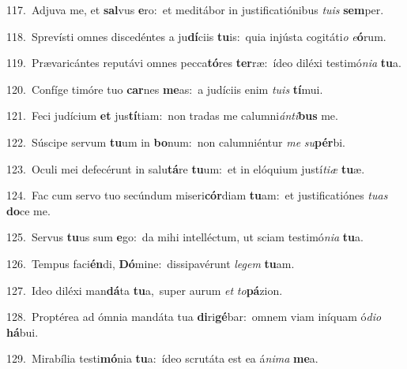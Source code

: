 {\numbfont\textcolor{\numbcolor}{117.}}~Adjuva me, et \textbf{sal}\-vus \textbf{e}\-ro:~\star et meditábor in justificatiónibus \textit{tu}\-\textit{is} \textbf{sem}\-per.\par
{\numbfont\textcolor{\numbcolor}{118.}}~Sprevísti omnes discedéntes a ju\-\textbf{dí}\-ciis \textbf{tu}\-is:~\star quia injústa cogitáti\textit{o} \textit{e}\-\textbf{ó}rum.\par
{\numbfont\textcolor{\numbcolor}{119.}}~Prævaricántes reputávi omnes pecca\-\textbf{tó}\-res \textbf{ter}\-ræ:~\star ídeo diléxi testimó\-\textit{ni}\-\textit{a} \textbf{tu}\-a.\par
{\numbfont\textcolor{\numbcolor}{120.}}~Confíge timóre tuo \textbf{car}\-nes \textbf{me}\-as:~\star a judíciis enim \textit{tu}\-\textit{is} \textbf{tí}\-mui.\par
{\numbfont\textcolor{\numbcolor}{121.}}~Feci judícium \textbf{et} jus\-\textbf{tí}\-tiam:~\star non tradas me calumni\-\textit{án}\-\textit{ti}\textbf{bus} me.\par
{\numbfont\textcolor{\numbcolor}{122.}}~Súscipe servum \textbf{tu}\-um in \textbf{bo}\-num:~\star non calumniéntur \textit{me} \textit{su}\-\textbf{pér}bi.\par
{\numbfont\textcolor{\numbcolor}{123.}}~Oculi mei defecérunt in salu\-\textbf{tá}\-re \textbf{tu}\-um:~\star et in elóquium justí\-\textit{ti}\-\textit{æ} \textbf{tu}\-æ.\par
{\numbfont\textcolor{\numbcolor}{124.}}~Fac cum servo tuo secúndum miseri\-\textbf{cór}\-diam \textbf{tu}\-am:~\star et justificatiónes \textit{tu}\-\textit{as} \textbf{do}\-ce me.\par
{\numbfont\textcolor{\numbcolor}{125.}}~Servus \textbf{tu}\-us sum \textbf{e}\-go:~\star da mihi intelléctum, ut sciam testimó\-\textit{ni}\-\textit{a} \textbf{tu}\-a.\par
{\numbfont\textcolor{\numbcolor}{126.}}~Tempus faci\-\textbf{én}\-di, \textbf{Dó}\-mine:~\star dissipavérunt \textit{le}\-\textit{gem} \textbf{tu}\-am.\par
{\numbfont\textcolor{\numbcolor}{127.}}~Ideo diléxi man\-\textbf{dá}\-ta \textbf{tu}\-a,~\star super aurum \textit{et} \textit{to}\-\textbf{pá}zion.\par
{\numbfont\textcolor{\numbcolor}{128.}}~Proptérea ad ómnia mandáta tua \textbf{di}\-ri\-\textbf{gé}\-bar:~\star omnem viam iníquam ó\-\textit{di}\-\textit{o} \textbf{há}\-bui.\par
{\numbfont\textcolor{\numbcolor}{129.}}~Mirabília testi\-\textbf{mó}\-nia \textbf{tu}\-a:~\star ídeo scrutáta est ea á\-\textit{ni}\-\textit{ma} \textbf{me}\-a.\par
